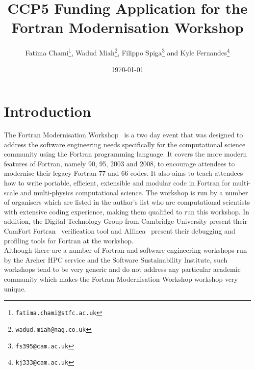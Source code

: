 \documentclass[12pt]{article}
\title{\bf CCP5 Funding Application for the Fortran Modernisation Workshop}
\author{Fatima Chami\footnote{\texttt{fatima.chami@stfc.ac.uk}},
  Wadud Miah\footnote{\texttt{wadud.miah@nag.co.uk}},
  Filippo Spiga\footnote{\texttt{fs395@cam.ac.uk}} and
  Kyle Fernandes\footnote{\texttt{kj333@cam.ac.uk}}}
\date{\today}
\begin{document}
\maketitle

%
\section{Introduction}
The Fortran Modernisation Workshop~\cite{fmw:nag} is a two day event
that was designed to
address the software engineering needs specifically for the computational science community using the Fortran programming language.
It covers the more modern features of Fortran, namely 90, 95, 2003 and 2008, to encourage attendees to modernise their legacy
Fortran 77 and 66 codes. It also aims to teach attendees how to write portable, efficient, extensible and modular code in Fortran for
multi-scale and multi-physics computational science. The workshop is run by a number of organisers which are listed in the author's
list who are computational scientists with extensive coding experience, making them qualified to run this workshop. In addition, the
Digital Technology Group from Cambridge University present their CamFort Fortran~\cite{cam:naps} verification tool and
Allinea~\cite{allinea} present their debugging and
profiling tools for Fortran at the workshop. \\

Although there are a number of Fortran and software engineering workshops run by the Archer HPC
service and the Software Sustainability Institute, such workshops tend to be very generic and do not address any particular
academic community which makes the Fortran Modernisation Workshop workshop very unique. \\
\end{document}
